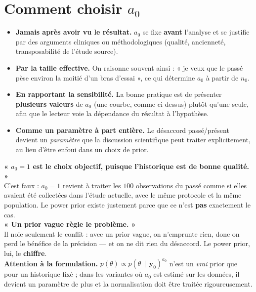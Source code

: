 \documentclass[11pt,a4paper]{article}
\newcommand{\given}{\,\mid\,}
\newcommand{\data}{\mathbf{y}}
\begin{document}
\section{Comment choisir $a_0$}

\begin{itemize}
  \item \textbf{Jamais après avoir vu le résultat.} $a_0$ se fixe \textbf{avant} l'analyse et
        se justifie par des arguments cliniques ou méthodologiques (qualité, ancienneté,
        transposabilité de l'étude source).
  \item \textbf{Par la taille effective.} On raisonne souvent ainsi : « je veux que le passé
        pèse environ la moitié d'un bras d'essai », ce qui détermine $a_0$ à partir de $n_0$.
  \item \textbf{En rapportant la sensibilité.} La bonne pratique est de présenter
        \textbf{plusieurs valeurs} de $a_0$ (une courbe, comme ci-dessus) plutôt qu'une seule,
        afin que le lecteur voie la dépendance du résultat à l'hypothèse.
  \item \textbf{Comme un paramètre à part entière.} Le désaccord passé/présent devient
        un \emph{paramètre} que la discussion scientifique peut traiter explicitement,
        au lieu d'être enfoui dans un choix de prior.
\end{itemize}

\begin{piege}
\textbf{« $a_0 = 1$ est le choix objectif, puisque l'historique est de bonne qualité. »}\\
C'est faux : $a_0 = 1$ revient à traiter les $100$ observations du passé comme si elles
avaient été collectées dans l'étude actuelle, avec le même protocole et la même population.
Le power prior existe justement parce que ce n'est \textbf{pas} exactement le cas.\\[2pt]
\textbf{« Un prior vague règle le problème. »}\\
Il noie seulement le conflit : avec un prior vague, on n'emprunte rien, donc on perd le
bénéfice de la précision --- et on ne dit rien du désaccord. Le power prior, lui, le
\textbf{chiffre}.\\[2pt]
\textbf{Attention à la formulation.} $p(\theta) \propto p(\theta \given \data_0)^{a_0}$
n'est un \emph{vrai} prior que pour un historique fixé ; dans les variantes où $a_0$ est
estimé sur les données, il devient un paramètre de plus et la normalisation doit être
traitée rigoureusement.
\end{piege}
\end{document}
